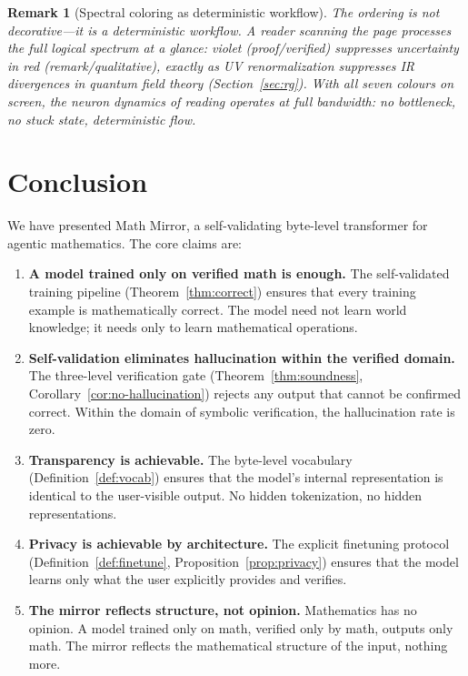 \documentclass[11pt,a4paper]{article}
\newtheorem{remark}[theorem]{Remark}
\begin{document}
\begin{remark}[Spectral coloring as deterministic workflow]
\medskip
The ordering is not decorative---it is a \emph{deterministic
workflow}.
A reader scanning the page processes
the full logical spectrum at a glance:
\textcolor{specViolet}{violet} (proof/verified) suppresses uncertainty in
\textcolor{specRed}{red} (remark/qualitative),
exactly as UV renormalization suppresses IR divergences
in quantum field theory
(Section~\ref{sec:rg}).
With all seven colours on screen, the neuron dynamics
of reading operates at full bandwidth:
no bottleneck, no stuck state, deterministic flow.
\end{remark}

\section{Conclusion}\label{sec:conclusion}

We have presented Math Mirror, a self-validating byte-level
transformer for agentic mathematics.
The core claims are:

\begin{enumerate}[nosep]
\item \textbf{A model trained only on verified math is enough.}
  The self-validated training pipeline
  (Theorem~\ref{thm:correct}) ensures that every training
  example is mathematically correct.
  The model need not learn world knowledge; it needs only to
  learn mathematical operations.

\item \textbf{Self-validation eliminates hallucination within
  the verified domain.}
  The three-level verification gate
  (Theorem~\ref{thm:soundness}, Corollary~\ref{cor:no-hallucination})
  rejects any output that cannot be confirmed correct.
  Within the domain of symbolic verification, the hallucination
  rate is zero.

\item \textbf{Transparency is achievable.}
  The byte-level vocabulary (Definition~\ref{def:vocab})
  ensures that the model's internal representation is identical
  to the user-visible output.
  No hidden tokenization, no hidden representations.

\item \textbf{Privacy is achievable by architecture.}
  The explicit finetuning protocol
  (Definition~\ref{def:finetune},
  Proposition~\ref{prop:privacy}) ensures that the model
  learns only what the user explicitly provides and verifies.

\item \textbf{The mirror reflects structure, not opinion.}
  Mathematics has no opinion.
  A model trained only on math, verified only by math,
  outputs only math.
  The mirror reflects the mathematical structure of the
  input, nothing more.
\end{enumerate}
\end{document}
